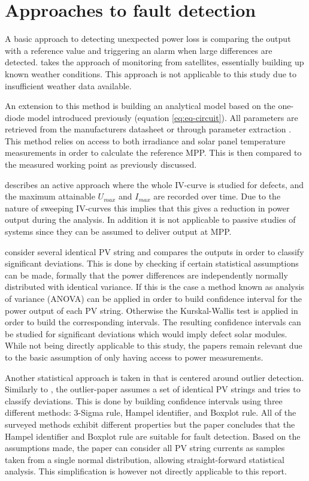 \clearpage
\section{Approaches to fault detection}
A basic approach to detecting unexpected power loss is comparing the output with a reference value and triggering an alarm when large differences are detected.
\cite{Stettler2005} takes the approach of monitoring from satellites, essentially building up known weather conditions.
This approach is not applicable to this study due to insufficient weather data available.

An extension to this method is building an analytical model \cite{Chouder2010,Raina2013,Chao2008}
based on the one-diode model introduced previously (equation \ref{eq:eq-circuit}).
All parameters are retrieved from the manufacturers datasheet or through parameter extraction \cite{Eicker2005,Chouder2009,Walker2001}.
This method relies on access to both irradiance and solar panel temperature measurements in order to calculate the reference MPP.
This is then compared to the measured working point as previously discussed.

\cite{Meyer2004} describes an active approach where the whole IV-curve is studied for defects, and the maximum attainable $U_{max}$ and $I_{max}$ are recorded over time.
Due to the nature of sweeping IV-curves this implies that this gives a reduction in power output during the analysis.
In addition it is not applicable to passive studies of systems since they can be assumed to deliver output at MPP.

\cite{Vergura2008,Vergura2009} consider several identical PV string and compares the outputs in order to classify significant deviations.
This is done by checking if certain statistical assumptions can be made, formally that the power differences are independently normally distributed with identical variance.
If this is the case a method known as analysis of variance (ANOVA) can be applied in order to build confidence interval for the power output of each PV string.
Otherwise the Kurskal-Wallis test is applied in order to build the corresponding intervals.
The resulting confidence intervals can be studied for significant deviations which would imply defect solar modules.
While not being directly applicable to this study, the papers remain relevant due to the basic assumption of only having access to power measurements.

Another statistical approach is taken in \cite{Zhao2013outlier} that is centered around outlier detection.
Similarly to \cite{Vergura2008,Vergura2009}, the outlier-paper assumes a set of identical PV strings and tries to classify deviations.
This is done by building confidence intervals using three different methods: 3-Sigma rule, Hampel identifier, and Boxplot rule.
All of the surveyed methods exhibit different properties but the paper concludes that the Hampel identifier and Boxplot rule are suitable for fault detection.
Based on the assumptions made, the paper can consider all PV string currents as samples taken from a single normal distribution, allowing straight-forward statistical analysis.
This simplification is however not directly applicable to this report.

